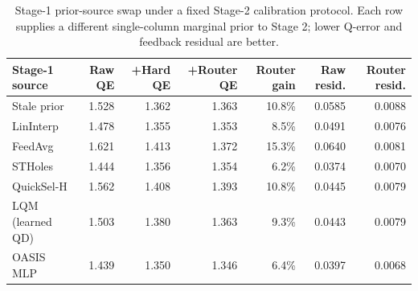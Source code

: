 \begin{table}[t]
  \centering
  \small
  \caption{Stage-1 prior-source swap under a fixed Stage-2 calibration protocol. Each row supplies a different single-column marginal prior to Stage 2; lower Q-error and feedback residual are better.}
  \label{tab:stage1_estimator_swap}
  \setlength{\tabcolsep}{4pt}
  \begin{tabular}{lrrrrrr}
    \toprule
    Stage-1 source & Raw QE & +Hard QE & +Router QE & Router gain & Raw resid. & Router resid. \\
    \midrule
    Stale prior & 1.528 & 1.362 & 1.363 & 10.8\% & 0.0585 & 0.0088 \\
    LinInterp & 1.478 & 1.355 & 1.353 & 8.5\% & 0.0491 & 0.0076 \\
    FeedAvg & 1.621 & 1.413 & 1.372 & 15.3\% & 0.0640 & 0.0081 \\
    STHoles & 1.444 & 1.356 & 1.354 & 6.2\% & 0.0374 & 0.0070 \\
    QuickSel-H & 1.562 & 1.408 & 1.393 & 10.8\% & 0.0445 & 0.0079 \\
    LQM (learned QD) & 1.503 & 1.380 & 1.363 & 9.3\% & 0.0443 & 0.0079 \\
    OASIS MLP & 1.439 & 1.350 & 1.346 & 6.4\% & 0.0397 & 0.0068 \\
    \bottomrule
  \end{tabular}
\end{table}
